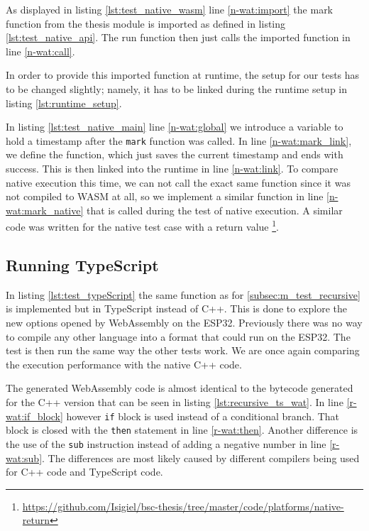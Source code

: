

As displayed in listing \ref{lst:test_native_wasm} line \ref{n-wat:import} the mark function from the thesis module is imported as defined in listing \ref{lst:test_native_api}. The run function then just calls the imported function in line \ref{n-wat:call}.

In order to provide this imported function at runtime, the setup for our tests has to be changed slightly; namely, it has to be linked during the runtime setup in listing \ref{lst:runtime_setup}.



In listing \ref{lst:test_native_main} line \ref{n-wat:global} we introduce a variable to hold a timestamp after the \lstinline{mark} function was called. In line \ref{n-wat:mark_link}, we define the function, which just saves the current timestamp and ends with success. This is then linked into the runtime in line \ref{n-wat:link}. To compare native execution this time, we can not call the exact same function since it was not compiled to WASM at all, so we implement a similar function in line \ref{n-wat:mark_native} that is called during the test of native execution. A similar code was written for the native test case with a return value \footnote{\url{https://github.com/Isigiel/bsc-thesis/tree/master/code/platforms/native-return}}.

\subsection{Running TypeScript}\label{subsec:typeScript}

In listing \ref{lst:test_typeScript} the same function as for \ref{subsec:m_test_recursive} is implemented but in TypeScript instead of C++. This is done to explore the new options opened by WebAssembly on the ESP32. Previously there was no way to compile any other language into a format that could run on the ESP32. The test is then run the same way the other tests work. We are once again comparing the execution performance with the native C++ code.



The generated WebAssembly code is almost identical to the bytecode generated for the C++ version that can be seen in listing \ref{lst:recursive_ts_wat}. In line \ref{r-wat:if_block} however \lstinline{if} block is used instead of a conditional branch. That block is closed with the \lstinline{then} statement in line \ref{r-wat:then}. Another difference is the use of the \lstinline{sub} instruction instead of adding a negative number in line \ref{r-wat:sub}. The differences are most likely caused by different compilers being used for C++ code and TypeScript code.

